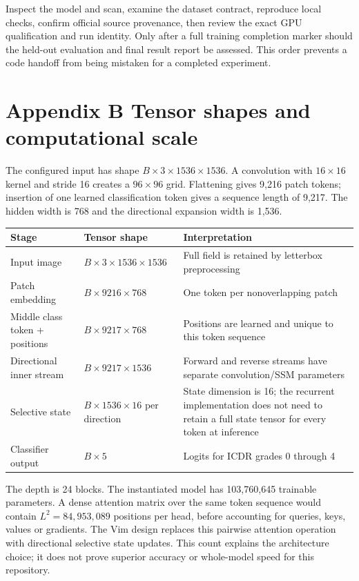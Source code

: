 Inspect the model and scan, examine the dataset contract, reproduce local
checks, confirm official source provenance, then review the exact GPU
qualification and run identity. Only after a full training completion
marker should the held-out evaluation and final result report be assessed.
This order prevents a code handoff from being mistaken for a completed
experiment.

\newpage
\section*{\color{ink}Appendix B \quad Tensor shapes and computational scale}
The configured input has shape $B\times3\times1536\times1536$. A
convolution with $16\times16$ kernel and stride 16 creates a $96\times96$
grid. Flattening gives 9,216 patch tokens; insertion of one learned
classification token gives a sequence length of 9,217. The hidden width
is 768 and the directional expansion width is 1,536.

\small
\begin{tabularx}{\linewidth}{@{}p{.27\linewidth}p{.27\linewidth}Y@{}}
\toprule
Stage & Tensor shape & Interpretation\\
\midrule
Input image & $B\times3\times1536\times1536$ & Full field is retained
by letterbox preprocessing\\
Patch embedding & $B\times9216\times768$ & One token per nonoverlapping
patch\\
Middle class token + positions & $B\times9217\times768$ & Positions are
learned and unique to this token sequence\\
Directional inner stream & $B\times9217\times1536$ & Forward and reverse
streams have separate convolution/SSM parameters\\
Selective state & $B\times1536\times16$ per direction & State dimension
is 16; the recurrent implementation does not need to retain a full
state tensor for every token at inference\\
Classifier output & $B\times5$ & Logits for ICDR grades 0 through 4\\
\bottomrule
\end{tabularx}
\normalsize

The depth is 24 blocks. The instantiated model has 103,760,645 trainable
parameters. A dense attention matrix over the same token sequence would
contain $L^2=84{,}953{,}089$ positions per head, before accounting for
queries, keys, values or gradients. The Vim design replaces this pairwise
attention operation with directional selective state updates. This count
explains the architecture choice; it does not prove superior accuracy or
whole-model speed for this repository.

